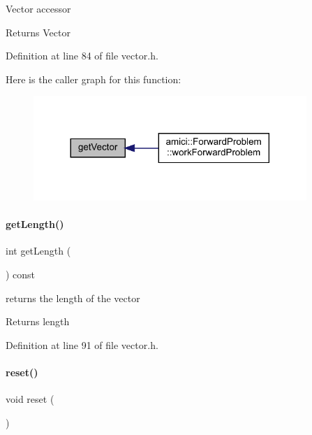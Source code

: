 Vector accessor \begin{DoxyReturn}{Returns}
Vector 
\end{DoxyReturn}


Definition at line 84 of file vector.\+h.

Here is the caller graph for this function\+:
\nopagebreak
\begin{figure}[H]
\begin{center}
\leavevmode
\includegraphics[width=293pt]{classamici_1_1_ami_vector_a5f73cf1c7b6769c44dfb51b048ec4d63_icgraph}
\end{center}
\end{figure}
\mbox{\label{classamici_1_1_ami_vector_a5f00d4dc3e7866d193ce926f35542801}} 
\paragraph{\texorpdfstring{get\+Length()}{getLength()}}
{\footnotesize\ttfamily int get\+Length (\begin{DoxyParamCaption}{ }\end{DoxyParamCaption}) const}

returns the length of the vector \begin{DoxyReturn}{Returns}
length 
\end{DoxyReturn}


Definition at line 91 of file vector.\+h.

\mbox{\label{classamici_1_1_ami_vector_ad20897c5c8bd47f5d4005989bead0e55}} 
\paragraph{\texorpdfstring{reset()}{reset()}}
{\footnotesize\ttfamily void reset (\begin{DoxyParamCaption}{ }\end{DoxyParamCaption})}

